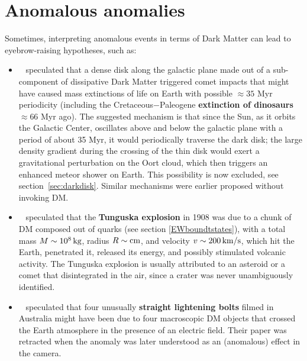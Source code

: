 \section{Anomalous anomalies}
\label{sec:anomanom}
Sometimes, interpreting anomalous events in terms of Dark Matter can lead to eyebrow-raising hypotheses, such as:
\begin{itemize}
\item[$\varnothing$] ~\cite{darkdisk} 
speculated that a dense disk along the galactic plane made out of a sub-component of dissipative Dark Matter
triggered comet impacts that
might have caused mass extinctions of life on Earth with possible $\approx 35$ Myr periodicity
(including the Cretaceous$-$Paleogene {\bf extinction of dinosaurs} $\approx 66$ Myr ago).
The suggested mechanism is that since the Sun, as it orbits the Galactic Center, oscillates above and below the galactic plane with a period of about 35 Myr, it would periodically traverse the dark disk; 
the large density gradient during the crossing of the thin disk would exert a gravitational perturbation on the Oort cloud, which then triggers an enhanced meteor shower on Earth.
This possibility is now excluded, see section~\ref{sec:darkdisk}.
Similar mechanisms were earlier proposed without invoking DM.

\item[$\varnothing$]  
~\cite{EWsolitons} speculated that 
the {\bf Tunguska explosion} in 1908 was due to
a chunk of DM composed out of quarks (see section \ref{EWboundtstates}), 
with a total mass $M \sim 10^8\,{\rm kg}$, radius $R \sim{\rm cm}$, and velocity $v \sim 200\,{\rm km/s}$,
which hit the Earth, penetrated it, released its energy, and possibly stimulated volcanic activity.
The Tunguska explosion is usually attributed to an asteroid or a comet that disintegrated in the air,
since a crater was never unambiguously identified.

\item[$\varnothing$] ~\cite{MacroscopicDM}
speculated that four unusually {\bf straight lightening bolts} filmed in Australia might have been due 
to four macroscopic DM objects that crossed the Earth atmosphere in the presence of an electric field.
Their paper was retracted when the anomaly was later understood as an (anomalous) effect in the camera.
\end{itemize}



